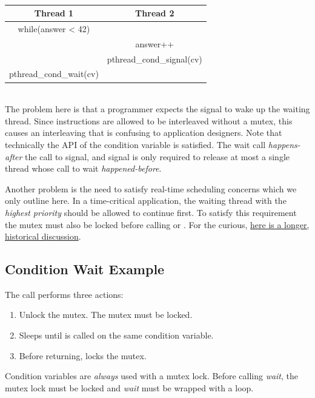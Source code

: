 \\
\begin{center}
\begin{tabular}{|c|c|}
  Thread 1 & Thread 2 \\ \hline
  while(answer < 42) & \\
  & answer++ \\
  & pthread\_cond\_signal(cv) \\
  pthread\_cond\_wait(cv)
\end{tabular}
\end{center}
\\
The problem here is that a programmer expects the signal to wake up the waiting thread.
Since instructions are allowed to be interleaved without a mutex, this causes an interleaving that is confusing to application designers.
Note that technically the API of the condition variable is satisfied.
The wait call \textit{happens-after} the call to signal, and signal is only required to release at most a single thread whose call to wait \textit{happened-before}.

Another problem is the need to satisfy real-time scheduling concerns which we only outline here.
In a time-critical application, the waiting thread with the \emph{highest priority} should be allowed to continue first.
To satisfy this requirement the mutex must also be locked before calling  or .
For the curious, \href{https://groups.google.com/forum/?hl=ky\#!msg/comp.programming.threads/wEUgPq541v8/ZByyyS8acqMJ}{here is a longer, historical discussion}.

\subsection{Condition Wait Example}

The call  performs three actions:

\begin{enumerate}
\item Unlock the mutex. The mutex must be locked.
\item Sleeps until  is called on the same condition variable.
\item Before returning, locks the mutex.
\end{enumerate}

Condition variables are \emph{always} used with a mutex lock.
Before calling \emph{wait}, the mutex lock must be locked and \emph{wait} must be wrapped with a loop.

